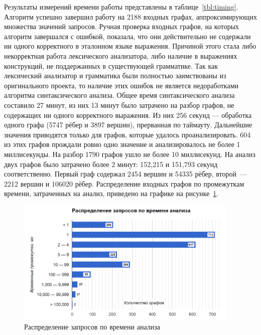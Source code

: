 Результаты измерений времени работы представлены в таблице~\ref{tbl:timing}. Алгоритм успешно завершил работу на 2188 входных графах, аппроксимирующих множества значений запросов. Ручная проверка входных графов, на которых алгоритм завершался с ошибкой, показала, что они действительно не содержали ни одного корректного в эталонном языке выражения. Причиной этого стала либо некорректная работа лексического анализатора, либо наличие в выражениях конструкций, не поддержанных в существующей грамматике. Так как лексический анализатор и грамматика были полностью заимствованы из оригинального проекта, то наличие этих ошибок не является недоработками алгоритма синтаксического анализа. Общее время синтаксического анализа составило 27 минут, из них 13 минут было затрачено на разбор графов, не содержащих ни одного корректного выражения. Из них 256 секунд --- обработка одного графа (5747 рёбер и 3897 вершин), прерванная по таймауту. Дальнейшие значения приводятся только для графов, которые удалось проанализировать. 604 из этих графов прождали ровно одно значение и анализировалось не более 1 миллисекунды. На разбор 1790 графов ушло не более 10 миллисекунд. На анализ двух графов было затрачено более 2 минут: 152,215 и 151,793 секунд соответственно. Первый граф содержал 2454 вершин и 54335 рёбер, второй~--- 2212 вершин и 106020 рёбер. Распределение входных графов по промежуткам времени, затраченных на анализ, приведено на графике на рисунке~\ref{distr}.

\begin{figure}[H]
  \centering
 \includegraphics[width=0.95\textwidth]{pics/distr.png}
 \caption{Распределение запросов по времени анализа}
 \label{distr}
\end{figure}


